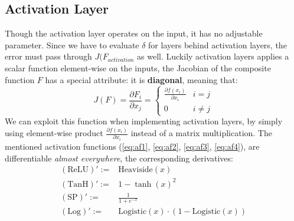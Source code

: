 \subsection{Activation Layer} 
Though the activation layer operates on the input, it has no adjustable parameter. 
Since we have to evaluate $\delta$ for layers behind activation layers, the error must pass through $J(F_{activation}$ as well.
Luckily activation layers applies a scalar function element-wise on the inputs, 
the Jacobian of the composite function $F$ has a special attribute: it is \textbf{diagonal}, meaning that:
$$
    J(F) = \frac{\partial F_i}{\partial x_j} = 
    \begin{cases}
        \frac{\partial f(x_i)}{\partial x_i} & i = j\\
        0 & i \neq j
    \end{cases}
$$
We can exploit this function when implementing activation layers, by simply using element-wise product $\frac{\partial f(x_i)}{\partial x_i}$ instead of a matrix multiplication.
The mentioned activation functions (\ref{eq:af1}, \ref{eq:af2}, \ref{eq:af3}, \ref{eq:af4}), are differentiable \emph{almost everywhere}, the corresponding derivatives:
\begin{align}
    \mathrm{(ReLU)' := } &\mathrm{Heaviside}(x)\\
    \mathrm{(TanH)' := }   & 1 - \tanh(x)^2\\
    \mathrm{(SP)' := }   &\frac{1}{1+e^{-x}}\\
    \mathrm{(Log)' := }  &\mathrm{Logistic}(x)\cdot (1-\mathrm{Logistic}(x))
\end{align}
